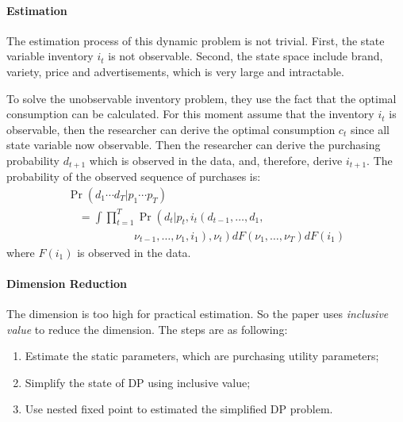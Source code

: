 \paragraph{Estimation}

The estimation process of this dynamic problem is not trivial.
First, the state variable inventory $i_t$ is not observable.
Second, the state space include brand, variety, price and advertisements, which is very large and intractable.

To solve the unobservable inventory problem, they use the fact that the optimal consumption can be calculated. 
For this moment assume that the inventory $i_t$ is observable, then the researcher can derive the optimal consumption $c_t$ since all state variable now observable.
Then the researcher can derive the purchasing probability $d_{t+1}$ which is observed in the data, and, therefore, derive $i_{t+1}$.
The probability of the observed sequence of purchases is:
\[
    \begin{array}{l}{\operatorname{Pr}\left(d_{1} \cdots d_{T} | p_{1} \cdots p_{T}\right)} \\ {\quad=\int \prod_{t=1}^{T} \operatorname{Pr}\left(d_{t} | p_{t}, i_{t}\left(d_{t-1}, \ldots, d_{1},\right.\right.} \\ 
    \quad \quad \quad \quad \quad \quad {\left.\left.\nu_{t-1}, \ldots, \nu_{1}, i_{1}\right), \nu_{t}\right) d F\left(\nu_{1}, \ldots, \nu_{T}\right) d F\left(i_{1}\right)}\end{array}
\]
where $F(i_1)$ is observed in the data.

\paragraph{Dimension Reduction}

The dimension is too high for practical estimation.
So the paper uses \textit{inclusive value} to reduce the dimension. 
The steps are as following:
\begin{enumerate}
    \item Estimate the static parameters, which are purchasing utility parameters;
    \item Simplify the state of DP using inclusive value;
    \item Use nested fixed point to estimated the simplified DP problem.
\end{enumerate}

